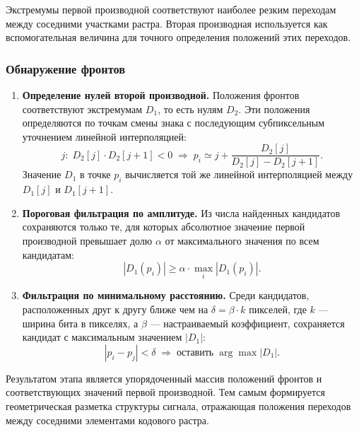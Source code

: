 Экстремумы первой производной соответствуют наиболее резким переходам между соседними участками растра. Вторая производная используется как вспомогательная величина для точного определения положений этих переходов.

\subsubsection{Обнаружение фронтов}

\begin{enumerate}
    \item \textbf{Определение нулей второй производной.} Положения фронтов соответствуют экстремумам $D_1$, то есть нулям $D_2$. Эти положения определяются по точкам смены знака с последующим субпиксельным уточнением линейной интерполяцией:
    \begin{equation}
        j:\;D_2[j]\cdot D_2[j+1] < 0
        \;\Rightarrow\;
        p_i \simeq j + \frac{D_2[j]}{D_2[j]-D_2[j+1]}.
        \label{eq:zerocross}
    \end{equation}
    Значение $D_1$ в точке $p_i$ вычисляется той же линейной интерполяцией между $D_1[j]$ и $D_1[j+1]$.

    \item \textbf{Пороговая фильтрация по амплитуде.} Из числа найденных кандидатов сохраняются только те, для которых абсолютное значение первой производной превышает долю $\alpha$ от максимального значения по всем кандидатам:
    \begin{equation}
        |D_1(p_i)| \geq \alpha \cdot \max_i |D_1(p_i)|.
    \end{equation}

    \item \textbf{Фильтрация по минимальному расстоянию.} Среди кандидатов, расположенных друг к другу ближе чем на $\delta = \beta\cdot k$ пикселей, где $k$ --- ширина бита в пикселях, а $\beta$ --- настраиваемый коэффициент, сохраняется кандидат с максимальным значением $|D_1|$:
    \begin{equation}
        |p_i - p_j| < \delta
        \;\Rightarrow\;
        \mathrm{оставить}\;\arg\max |D_1|.
    \end{equation}
\end{enumerate}

Результатом этапа является упорядоченный массив положений фронтов и соответствующих значений первой производной. Тем самым формируется геометрическая разметка структуры сигнала, отражающая положения переходов между соседними элементами кодового растра.

